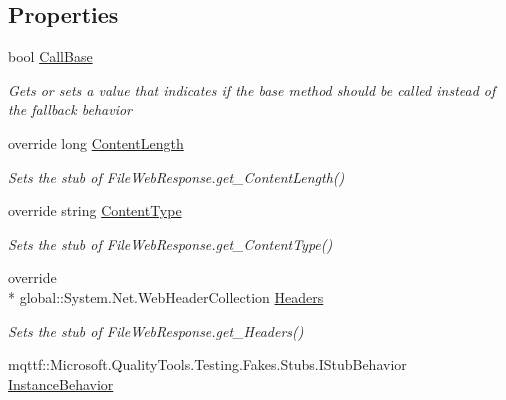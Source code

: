 \subsection*{Properties}
\begin{DoxyCompactItemize}
\item 
bool \hyperlink{class_system_1_1_net_1_1_fakes_1_1_stub_file_web_response_a059240b4b6905a0a7a4a6e760f7dd10e}{Call\-Base}
\begin{DoxyCompactList}\small\item\em Gets or sets a value that indicates if the base method should be called instead of the fallback behavior\end{DoxyCompactList}\item 
override long \hyperlink{class_system_1_1_net_1_1_fakes_1_1_stub_file_web_response_a8dedadf925d0041968ae0dac2e3bed3d}{Content\-Length}
\begin{DoxyCompactList}\small\item\em Sets the stub of File\-Web\-Response.\-get\-\_\-\-Content\-Length()\end{DoxyCompactList}\item 
override string \hyperlink{class_system_1_1_net_1_1_fakes_1_1_stub_file_web_response_a6dad3d8f36c757b83f00752ef237ae00}{Content\-Type}
\begin{DoxyCompactList}\small\item\em Sets the stub of File\-Web\-Response.\-get\-\_\-\-Content\-Type()\end{DoxyCompactList}\item 
override \\*
global\-::\-System.\-Net.\-Web\-Header\-Collection \hyperlink{class_system_1_1_net_1_1_fakes_1_1_stub_file_web_response_ab5aec47f110b9e2e155ff188ab11cbc2}{Headers}
\begin{DoxyCompactList}\small\item\em Sets the stub of File\-Web\-Response.\-get\-\_\-\-Headers()\end{DoxyCompactList}\item 
mqttf\-::\-Microsoft.\-Quality\-Tools.\-Testing.\-Fakes.\-Stubs.\-I\-Stub\-Behavior \hyperlink{class_system_1_1_net_1_1_fakes_1_1_stub_file_web_response_a724e44910e29e1b5b8288212161ac103}{Instance\-Behavior}

\end{DoxyCompactItemize}
